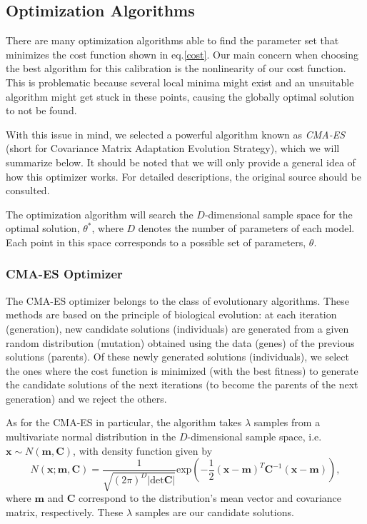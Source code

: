 \subsection{Optimization Algorithms}
There are many optimization algorithms able to find the parameter set that minimizes the cost function shown in eq.\eqref{cost}.
Our main concern when choosing the best algorithm for this calibration is the nonlinearity of our cost function. This is problematic because several local minima might exist and an unsuitable algorithm might get stuck in these points, causing the globally optimal solution to not be found.

With this issue in mind, we selected a powerful algorithm known as \emph{CMA-ES}~\citep{Hansen2} (short for Covariance Matrix Adaptation Evolution Strategy), which we will summarize below. It should be noted that we will only provide a general idea of how this optimizer works. For detailed descriptions, the original source should be consulted.

The optimization algorithm will search the $D$-dimensional sample space for the optimal solution, $\theta^{*}$, where $D$ denotes the number of parameters of each model. Each point in this space corresponds to a possible set of parameters, $\theta$.




\subsubsection{CMA-ES Optimizer}
The CMA-ES optimizer belongs to the class of evolutionary algorithms. These methods are based on the principle of biological evolution: at each iteration (generation), new candidate solutions (individuals) are generated from a given random distribution (mutation) obtained using the data (genes) of the previous solutions (parents). Of these newly generated solutions (individuals), we select the ones where the cost function is minimized (with the best fitness) to generate the candidate solutions of the next iterations (to become the parents of the next generation) and we reject the others.



As for the CMA-ES in particular, the algorithm takes $\lambda$ samples from a multivariate normal distribution in the $D$-dimensional sample space, i.e. $\mathbf{x}\sim N(\mathbf{m,C})$, with density function given by
\begin{equation}
N(\mathbf{x;m,C})=\frac{1}{\sqrt{(2\pi)^D|\mathrm{det}\mathbf{C}|}}\mathrm{exp}\left(-\frac{1}{2}(\mathbf{x}-\mathbf{m})^T\mathbf{C}^{-1}(\mathbf{x}-\mathbf{m})\right),
\end{equation}
\noindent where $\mathbf{m}$ and $\mathbf{C}$ correspond to the distribution's mean vector and covariance matrix, respectively.
These $\lambda$ samples are our candidate solutions.

